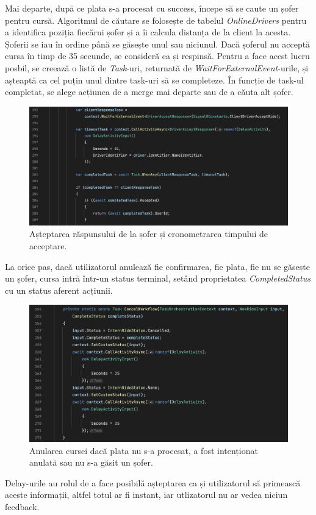 Mai departe, după ce plata s-a procesat cu success, începe să se caute un șofer pentru cursă.
Algoritmul de căutare se folosește de tabelul \textit{OnlineDrivers} pentru a identifica poziția
fiecărui șofer și a îi calcula distanța de la client la acesta. Șoferii se iau în ordine până se găsește
unul sau niciunul. Dacă șoferul nu acceptă cursa în timp de 35 secunde, se consideră ca și respinsă.
Pentru a face acest lucru posbil, se creează o listă de \textit{Task}-uri, returnată de \textit{WaitForExternalEvent}-urile,
și așteaptă ca cel puțin unul dintre task-uri să se completeze. În funcție de task-ul completat, se alege
acțiunea de a merge mai departe sau de a căuta alt șofer.

\begin{figure}[H]
    \centering
    \includegraphics[width=16cm]{Assets/WaitForDriver.png}
    \caption{Așteptarea răspunsului de la șofer și cronometrarea timpului de acceptare.}
    \label{fig:WaitForDriver}
\end{figure}

La orice pas, dacă utilizatorul anulează fie confirmarea, fie plata, fie nu se găsește un șofer, cursa intră într-un status
terminal, setând proprietatea \textit{CompletedStatus} cu un status aferent acțiunii.
\begin{figure}[H]
    \centering
    \includegraphics[width=16cm]{Assets/cancelFlow.png}
    \caption{Anularea cursei dacă plata nu s-a procesat, a fost intenționat anulată sau nu s-a găsit un șofer.}
    \label{fig:cancelFlow}
\end{figure}
Delay-urile au rolul de a face posibilă așteptarea ca și utilizatorul să primească aceste informații, altfel totul ar fi instant,
iar utlizatorul nu ar vedea niciun feedback.

